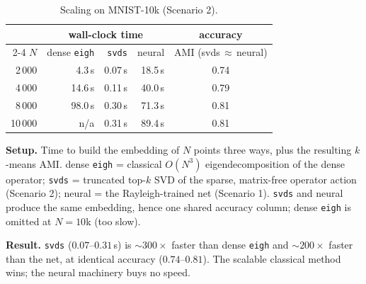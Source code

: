 \begin{table}[H]\centering\footnotesize
\caption{Scaling on MNIST-10k (Scenario 2).}
\label{tab:scale}
\begin{tabular}{r rrr c}
\toprule
& \multicolumn{3}{c}{wall-clock time} & accuracy\\
\cmidrule(lr){2-4}
$N$ & dense \texttt{eigh} & \texttt{svds} & neural & AMI (svds\,$\approx$\,neural)\\
\midrule
2\,000  & 4.3\,s  & 0.07\,s & 18.5\,s & 0.74\\
4\,000  & 14.6\,s & 0.11\,s & 40.0\,s & 0.79\\
8\,000  & 98.0\,s & 0.30\,s & 71.3\,s & 0.81\\
10\,000 & n/a     & 0.31\,s & 89.4\,s & 0.81\\
\bottomrule
\end{tabular}
\end{table}

\noindent\textbf{Setup.} Time to build the embedding of $N$ points three ways, plus the resulting
$k$-means AMI. dense \texttt{eigh} = classical $O(N^3)$ eigendecomposition of the dense operator;
\texttt{svds} = truncated top-$k$ SVD of the sparse, matrix-free operator action (Scenario 2);
neural = the Rayleigh-trained net (Scenario 1). \texttt{svds} and neural produce the same
embedding, hence one shared accuracy column; dense \texttt{eigh} is omitted at $N{=}10$k (too slow).

\noindent\textbf{Result.} \texttt{svds} ($0.07$--$0.31$\,s) is ${\sim}300\times$ faster than dense
\texttt{eigh} and ${\sim}200\times$ faster than the net, at identical accuracy ($0.74$--$0.81$). The
scalable classical method wins; the neural machinery buys no speed.
